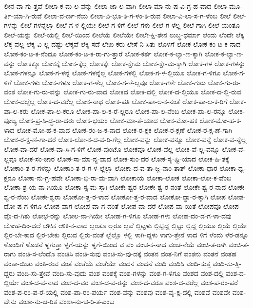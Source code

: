 {ಲೀನ-ವಾ-ಗು-ತ್ತವೆ
ಲೀಲಾ-ಕ-ಮ-ಲ-ವನ್ನು
ಲೀಲಾ-ಜಾ-ಲ-ವಾಗಿ
ಲೀಲಾ-ಮಾ-ನು-ಷ-ವಿ-ಗ್ರ-ಹ-ವಾದ
ಲೀಲಾ-ಮೂ-ರ್ತಿ-ಯಾ-ಗಿ-ರುವೆ
ಲೀಲಾ-ವ-ರ್ಣ-ನೆಯ
ಲೀಲಾ-ವಿ-ಭೂ-ತಿ-ಗ-ಳಂ-ತಿ-ರುವ
ಲೀಲಾ-ವಿ-ಲಾ-ಸ-ಗ-ಳೆಂಬ
ಲೀಲೆ
ಲೀಲೆ-ಗಳನ್ನು
ಲೀಲೆ-ಗಳನ್ನೆಲ್ಲಾ
ಲೀಲೆ-ಗ-ಳ-ಲ್ಲಿಯೇ
ಲೀಲೆ-ಗ-ಳಿಗೆ
ಲೀಲೆ-ಗಳು
ಲೀಲೆ-ಗ-ಳೆಲ್ಲ
ಲೀಲೆ-ಗಾಗಿ
ಲೀಲೆ-ಯಂತೂ
ಲೀಲೆ-ಯನ್ನು
ಲೀಲೆ-ಯಲ್ಲಿ
ಲೀಲೆ-ಯಿಂದ
ಲೀಲೆಯೆ
ಲೀಲೆಯೇ
ಲೀಲೇ-ಕ್ಷಿ-ತೇನ
ಲುಬ್ಧ-ಧರ್ಮಾ
ಲೆಂದು
ಲೆಂದೇ
ಲೆಕ್ಕ
ಲೆಕ್ಕ-ವಲ್ಲ
ಲೆಕ್ಕ-ವಿ-ಲ್ಲ-ದಷ್ಟು
ಲೆಕ್ಕವೆ
ಲೆಕ್ಕಿ-ಸದೆ
ಲೇಖ-ಕರು
ಲೇಸೆ-ನಿ-ಸಿತು
ಲೊಳಗೆ
ಲೋಕ
ಲೋಕ-ಕಂ-ಟ-ಕ-ನಾದ
ಲೋಕ-ಕಂ-ಟ-ಕ-ನೆಂದೂ
ಲೋಕ-ಕಂ-ಟ-ಕ-ರಾ-ಗು-ತ್ತಾರೆ
ಲೋಕ-ಕರ್ತ
ಲೋಕ-ಕ-ಲ್ಯಾ-ಣ-ಕ್ಕಾಗಿ
ಲೋಕ-ಕ-ಲ್ಯಾ-ಣ-ವನ್ನು
ಲೋಕಕ್ಕೂ
ಲೋಕಕ್ಕೆ
ಲೋಕ-ಕ್ಕೆಲ್ಲ
ಲೋಕಕ್ಕೇ
ಲೋಕ-ಕ್ಷೇಮ
ಲೋಕ-ಕ್ಷೇ-ಮ-ಕ್ಕಾಗಿ
ಲೋಕ-ಗಳ
ಲೋಕ-ಗಳನ್ನು
ಲೋಕ-ಗಳನ್ನೂ
ಲೋಕ-ಗ-ಳನ್ನೆ
ಲೋಕ-ಗಳನ್ನೆಲ್ಲ
ಲೋಕ-ಗಳಲ್ಲಿ
ಲೋಕ-ಗ-ಳ-ಲ್ಲಿಯೂ
ಲೋಕ-ಗ-ಳಿಗೂ
ಲೋಕ-ಗ-ಳಿಗೆ
ಲೋಕ-ಗಳು
ಲೋಕ-ಗಳೂ
ಲೋಕ-ಗ-ಳೆಲ್ಲ
ಲೋಕ-ಗ-ಳೆ-ಲ್ಲವೂ
ಲೋಕ-ಗಳೇ
ಲೋಕ-ಗುರು
ಲೋಕ-ಗು-ರು-ವಂತೆ
ಲೋಕ-ಗು-ರು-ವನ್ನು
ಲೋಕ-ಗು-ರು-ವಾದ
ಲೋಕದ
ಲೋಕ-ದಲ್ಲಿ
ಲೋಕ-ದ-ಲ್ಲಿಯೂ
ಲೋಕ-ದ-ಲ್ಲಿ-ರುವ
ಲೋಕ-ದಲ್ಲೆಲ್ಲ
ಲೋಕ-ದ-ವರೆಲ್ಲ
ಲೋಕ-ನಾಥ
ಲೋಕ-ಪತಿ
ಲೋಕ-ಪಾ-ಲ-ಕ-ನಂತೆ
ಲೋಕ-ಪಾ-ಲ-ಕ-ರಿಗೆ
ಲೋಕ-ಪಾ-ಲ-ಕರು
ಲೋಕ-ಪಾ-ಲ-ಕರೂ
ಲೋಕ-ಪಾ-ಲ-ಕ-ರೆ-ಲ್ಲರೂ
ಲೋಕ-ಪಾ-ಲ-ನೆಂಬ
ಲೋಕ-ಪಾ-ಲ-ರನ್ನೂ
ಲೋಕ-ಪೂಜ್ಯ
ಲೋಕ-ಪ್ರ-ಸಿ-ದ್ಧ-ರಾ-ದರು
ಲೋಕ-ಭಯಂ
ಲೋಕ-ಮಾ-ತೆ-ಯಾದ
ಲೋಕ-ಮೋ-ಹಕ
ಲೋಕ-ಮೋ-ಹ-ಕ-ಳಾದ
ಲೋಕ-ಮೋ-ಹ-ಕ-ವಾದ
ಲೋಕ-ರಂ-ಜ-ಕ-ನಾದ
ಲೋಕ-ರ-ಕ್ಷಕ
ಲೋಕ-ರ-ಕ್ಷಣೆ
ಲೋಕ-ರ-ಕ್ಷ-ಣೆ-ಗಾಗಿ
ಲೋಕ-ರ-ಕ್ಷ-ಣೆ-ಗಾ-ದರೆ
ಲೋಕ-ಲೋ-ಕ-ದ-ವ-ರಿ-ಗೆಲ್ಲ
ಲೋಕ-ವನ್ನು
ಲೋಕ-ವನ್ನೂ
ಲೋಕ-ವನ್ನೆ
ಲೋಕ-ವ-ನ್ನೆಲ್ಲ
ಲೋಕ-ವಾ-ದರೆ
ಲೋಕ-ವಾ-ಸಿ-ಗ-ಳಿಗೆ
ಲೋಕ-ವುಂಟೊ
ಲೋಕವೂ
ಲೋಕ-ವೆಲ್ಲ
ಲೋಕ-ವೆ-ಲ್ಲ-ವನ್ನೂ
ಲೋಕ-ವೆ-ಲ್ಲವೂ
ಲೋಕ-ಸಂ-ಚಾರ
ಲೋಕ-ಸಾ-ಮಾ-ನ್ಯ-ವಾದ
ಲೋಕ-ಸುಂ-ದರ
ಲೋಕ-ಸೃ-ಷ್ಟಿ-ಯಾದ
ಲೋಕ-ಹಿ-ತಕ್ಕೆ
ಲೋಕಾಂ-ತ-ರ-ಗಳನ್ನು
ಲೋಕಾಂ-ತ-ರ-ಗ-ಳ-ಲ್ಲೆಲ್ಲಾ
ಲೋಕಾ-ದ-ವ-ತಾ-ಜ್ಜ-ನಾಂ-ತಾತ್
ಲೋಕಾ-ಧಾರ
ಲೋಕಾ-ಧ್ಯ-ಕ್ಷನೂ
ಲೋಕಾ-ನು-ಗ್ರ-ಹವೇ
ಲೋಕಾ-ಭಿ-ರಾ-ಮ-ವಾಗಿ
ಲೋಕಾಯ
ಲೋಕಾ-ಲೋಕ
ಲೋಕಾ-ಲೋ-ಕ-ವೆಂಬ
ಲೋಕಾ-ಶ್ರ-ಯ-ನಾ-ಗಿಯೂ
ಲೋಕಾ-ಸ್ಸ-ಮ-ಸ್ತಾಃ
ಲೋಕೇ-ಶ್ವರ
ಲೋಕೇ-ಶ್ವ-ರ-ನಂತೆ
ಲೋಕೇ-ಶ್ವ-ರ-ನಾದ
ಲೋಕೇ-ಶ್ವ-ರ-ನೆಂಬ
ಲೋಕೇ-ಶ್ವರಾ
ಲೋಕೋ-ತ್ತ-ರ-ಳಾದ
ಲೋಕೋ-ತ್ತ-ರ-ವಾದ
ಲೋಕೋ-ದ್ಧಾ-ರ-ಕ್ಕಾಗಿ
ಲೋಪ
ಲೋಪ-ದೋ-ಷ-ಗ-ಳಿಗೂ
ಲೋಪ-ವಾಗ
ಲೋಪ-ವಾ-ಗ-ದಂತೆ
ಲೋಪ-ವಾ-ದರೆ
ಲೋಪ-ವಾ-ಯಿತೆ
ಲೋಪವೂ
ಲೋಪ-ವೊ-ದ-ಗಿತು
ಲೋಭ-ರನ್ನು
ಲೋಲ-ನಾ-ಗಿಯೇ
ಲೋಹ-ಗ-ಳಿಗೂ
ಲೋಹ-ಗಳು
ಲೋಹ-ದಂ-ಡ-ಗ-ಳಾ-ದವು
ಲೋಹ-ದಿಂ-ದಲೆ
ಲೌಕಿಕ
ಲೌಕಿ-ಕ-ವಾದ
ಲ್ಲಂತೂ
ಲ್ಲರೂ
ಲ್ಲವೆ
ಲ್ಲಿಟ್ಟಳು
ಲ್ಲಿಟ್ಟಿದ್ದ
ಲ್ಲಿಟ್ಟು
ಲ್ಲಿದ್ದ
ಲ್ಲಿಯೂ
ಲ್ಲಿಯೆ
ಲ್ಲಿಯೇ
ಲ್ಲಿರ-ಬೇ-ಕಾದ
ಲ್ಲಿರ-ಬೇಕು
ಲ್ಲಿರುವ
ಲ್ಲಿರು-ವಂತೆ
ಲ್ಲೆಲ್ಲೊ
ಳಲ್ಲಿ
ಳಾಗಿ-ದ್ದಳು
ಳಾಗು-ತ್ತೇನೆ
ಳಾದ
ಳಿಗೆ
ಳೆಂದು
ಳೆರ-ಡನ್ನೂ
ಳೊಂದಿಗೆ
ಳೊಡನೆ
ಳ್ನಗುತ್ತಾ
ಳ್ನಗೆ-ಯನ್ನು
ಳ್ನಗೆ-ಯಿಂದ
ವ
ವಂ
ವಂಚ-ಕ-ನಾದ
ವಂಚ-ನೆಯೆ
ವಂಚಿ-ತ-ರಾಗಿ
ವಂಚಿ-ತ-ರಾಗು
ವಂಚಿ-ಸ-ಲೆಂದೊ
ವಂಚಿಸಿ
ವಂಚಿ-ಸುವು
ವಂಚಿ-ಸು-ವು-ದಕ್ಕೆ
ವಂತನ
ವಂತ-ನಿಗೆ
ವಂತನು
ವಂತನೆ
ವಂತಹ
ವಂತಾ-ಯಿತು
ವಂತಿ-ರುವ
ವಂತೆ
ವಂತೆಯೆ
ವಂತೆಯೇ
ವಂದನ
ವಂದನೆ
ವಂದಿ
ವಂದಿಸಿ
ವಂದಿ-ಸುತ್ತ
ವಂದಿ-ಸು-ತ್ತಿ-ದ್ದರು
ವಂದಿ-ಸು-ತ್ತೇವೆ
ವಂದಿ-ಸು-ವುದು
ವಂಶ
ವಂಶಕ್ಕೆ
ವಂಶ-ಗಳನ್ನು
ವಂಶ-ಗ-ಳಿಗೂ
ವಂಶದ
ವಂಶ-ದಲ್ಲಿ
ವಂಶ-ದ-ಲ್ಲಿಯೇ
ವಂಶ-ದ-ವ-ನಾದ
ವಂಶ-ದ-ವರ
ವಂಶ-ದ-ವ-ರನ್ನು
ವಂಶ-ದ-ವರೂ
ವಂಶ-ದ-ವರೆಲ್ಲ
ವಂಶ-ಪ-ರಂ-ಪರೆ
ವಂಶ-ಪ-ರಂ-ಪ-ರೆ-ಯಲ್ಲಿ
ವಂಶ-ಪಾ-ರಂ-ಪರ್ಯ
ವಂಶ-ವನ್ನು
ವಂಶವು
ವಂಶ-ವೃ-ಕ್ಷ-ದಲ್ಲಿ
ವಂಶವೆ
ವಂಶವೇ
ವಂಶ-ವೇನು
ವಂಶಾ-ನು-ಚ-ರಿತ
ವಂಶಾ-ನು-ಚ-ರಿ-ತ-ಎಂಬ
}
